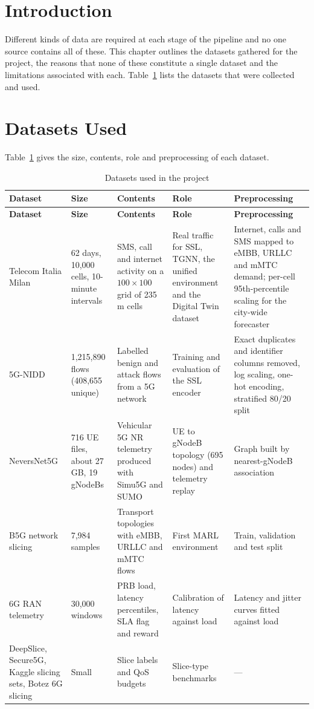 \label{chap.3}
\section{Introduction}
Different kinds of data are required at each stage of the pipeline and no one source contains all of these. This chapter outlines the datasets gathered for the project, the reasons that none of these constitute a single dataset and the limitations associated with each. Table~\ref{tab:datasets} lists the datasets that were collected and used.

\section{Datasets Used}
Table~\ref{tab:datasets} gives the size, contents, role and preprocessing of each dataset.

{\footnotesize
\begin{longtable}{|p{2.3cm}|p{2.5cm}|p{3.3cm}|p{2.6cm}|p{2.6cm}|}
\caption{Datasets used in the project}
\label{tab:datasets}\\
\hline
\textbf{Dataset} & \textbf{Size} & \textbf{Contents} & \textbf{Role} & \textbf{Preprocessing} \\ \hline
\endfirsthead
\hline
\textbf{Dataset} & \textbf{Size} & \textbf{Contents} & \textbf{Role} & \textbf{Preprocessing} \\ \hline
\endhead
Telecom Italia Milan & 62 days, 10,000 cells, 10-minute intervals & SMS, call and internet activity on a $100 \times 100$ grid of 235\,m cells & Real traffic for SSL, TGNN, the unified environment and the Digital Twin dataset & Internet, calls and SMS mapped to eMBB, URLLC and mMTC demand; per-cell 95th-percentile scaling for the city-wide forecaster \\ \hline
5G-NIDD & 1{,}215{,}890 flows (408{,}655 unique) & Labelled benign and attack flows from a 5G network & Training and evaluation of the SSL encoder & Exact duplicates and identifier columns removed{,} log scaling{,} one-hot encoding{,} stratified 80/20 split \\ \hline
NeversNet5G & 716 UE files, about 27\,GB, 19 gNodeBs & Vehicular 5G NR telemetry produced with Simu5G and SUMO & UE to gNodeB topology (695 nodes) and telemetry replay & Graph built by nearest-gNodeB association \\ \hline
B5G network slicing & 7,984 samples & Transport topologies with eMBB, URLLC and mMTC flows & First MARL environment & Train, validation and test split \\ \hline
6G RAN telemetry & 30,000 windows & PRB load, latency percentiles, SLA flag and reward & Calibration of latency against load & Latency and jitter curves fitted against load \\ \hline
DeepSlice, Secure5G, Kaggle slicing sets, Botez 6G slicing & Small & Slice labels and QoS budgets & Slice-type benchmarks & --- \\ \hline
\end{longtable}
}

